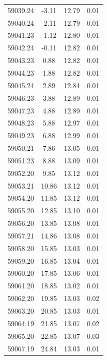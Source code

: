 \begin{longtable}{|c|c|c|c|}
 59039.24 &   -3.11 &       12.79 &          0.01 \\
 59040.24 &   -2.11 &       12.79 &          0.01 \\
 59041.23 &   -1.12 &       12.80 &          0.01 \\
 59042.24 &   -0.11 &       12.82 &          0.01 \\
 59043.23 &    0.88 &       12.82 &          0.01 \\
 59044.23 &    1.88 &       12.82 &          0.01 \\
 59045.24 &    2.89 &       12.84 &          0.01 \\
 59046.23 &    3.88 &       12.89 &          0.01 \\
 59047.23 &    4.88 &       12.89 &          0.01 \\
 59048.23 &    5.88 &       12.97 &          0.01 \\
 59049.23 &    6.88 &       12.99 &          0.01 \\
 59050.21 &    7.86 &       13.05 &          0.01 \\
 59051.23 &    8.88 &       13.09 &          0.01 \\
 59052.20 &    9.85 &       13.12 &          0.01 \\
 59053.21 &   10.86 &       13.12 &          0.01 \\
 59054.20 &   11.85 &       13.12 &          0.01 \\
 59055.20 &   12.85 &       13.10 &          0.01 \\
 59056.20 &   13.85 &       13.08 &          0.01 \\
 59057.21 &   14.86 &       13.08 &          0.01 \\
 59058.20 &   15.85 &       13.03 &          0.01 \\
 59059.20 &   16.85 &       13.04 &          0.01 \\
 59060.20 &   17.85 &       13.06 &          0.01 \\
 59061.20 &   18.85 &       13.02 &          0.01 \\
 59062.20 &   19.85 &       13.03 &          0.02 \\
 59063.20 &   20.85 &       13.03 &          0.01 \\
 59064.19 &   21.85 &       13.07 &          0.02 \\
 59065.20 &   22.85 &       13.07 &          0.03 \\
 59067.19 &   24.84 &       13.03 &          0.01 \\

\end{longtable}
